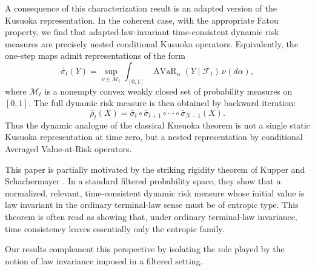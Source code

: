 \documentclass[a4paper]{amsart}
\theoremstyle{definition}
\DeclareMathOperator{\AVaR}{AVaR}
\newcommand{\F}{\mathcal{F}}
\begin{document}
A consequence of this characterization  result is an adapted version of the
Kusuoka representation. In the coherent case, with the appropriate Fatou
property, we find that adapted-law-invariant time-consistent dynamic risk
measures are precisely nested conditional Kusuoka operators. Equivalently, the
one-step maps admit representations of the form
\[
\bar\sigma_t(Y)
=
\sup_{\nu\in\mathcal M_t}
\int_{[0,1]}
\AVaR_\alpha(Y\mid\F_t)\,\nu(d\alpha),
\]
where \(\mathcal M_t\) is a nonempty convex weakly closed set of probability
measures on \([0,1]\). The full dynamic risk measure is then obtained by
backward iteration:
\[
\bar\rho_t(X)
=
\bar\sigma_{t}\circ
\bar\sigma_{t+1}\circ\cdots\circ
\bar\sigma_{N-1}(X).
\]
Thus the dynamic analogue of the classical Kusuoka theorem is not a single
static Kusuoka representation at time zero, but a nested representation by
conditional Averaged Value-at-Risk operators.
\medskip

This paper is partially  motivated by the striking rigidity theorem of
Kupper and Schachermayer \cite{KupperSchachermayer2009}. In a standard
filtered probability space, they show that a normalized, relevant,
time-consistent dynamic risk measure whose initial value is law invariant in
the ordinary terminal-law sense must be of entropic type. %
 This theorem is often read as showing that, under ordinary terminal-law
invariance, time consistency leaves essentially only the entropic family.

Our results complement this perspective by isolating the role played by the
notion of law invariance imposed in a filtered setting.
\end{document}
